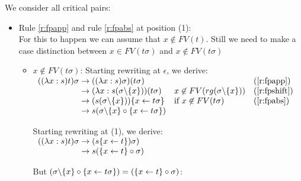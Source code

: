 \documentclass[a4paper]{article}
\theoremstyle{definition}
\begin{document}
We consider all critical pairs:
\begin{itemize}
\item Rule \ref{r:fpapp} and rule \ref{r:fpabs} at position (1):\\
  For this to happen we can assume that $x \not \in FV(t)$. Still we need to
  make a case distinction between $x \in FV(t\sigma)$ and $x \not \in FV(t\sigma)$\\

  \begin{itemize}
  \item $x \not \in FV(t\sigma)$: Starting rewriting at $\epsilon$, we derive:\\
    $
    \begin{array}{r@{\rewrites}lll}
      ((\lambda x:s)t)\sigma & ((\lambda x:s)\sigma)(t\sigma) & & (\ref{r:fpapp})\\
                             & (\lambda x : s(\sigma\fpwithoutset{x}))
                               (t\sigma) & x \not\in FV(rg(\sigma\fpwithoutset{x}))
                                                                & (\ref{r:fpshift})\\
                             & (s(\sigma\fpwithoutset{x}))\fpsubstin{
                               x \fpwith t\sigma} &  \mbox{if }x \not
                                                    \in FV(t\sigma) & (\ref{r:fpabs})\\
                             & s(\sigma\fpwithoutset{x} \fpscat
                               \fpsubstin{x \fpwith t\sigma}) & \\
    \end{array}
    $

    Starting rewriting at (1), we derive:\\

    $
    \begin{array}{r@{\rewrites}l}
      ((\lambda x:s)t)\sigma & (s\fpsubstin{x \fpwith t})\sigma ) \\
                             & s(\fpsubstin{x \fpwith t} \fpscat \sigma ) \\
    \end{array}
    $

    But $(\sigma\backslash\{x\} \circ \{x \leftarrow t\sigma\}) =
    (\{x \leftarrow t\} \circ \sigma)$:


\end{itemize}
\end{itemize}
\end{document}
